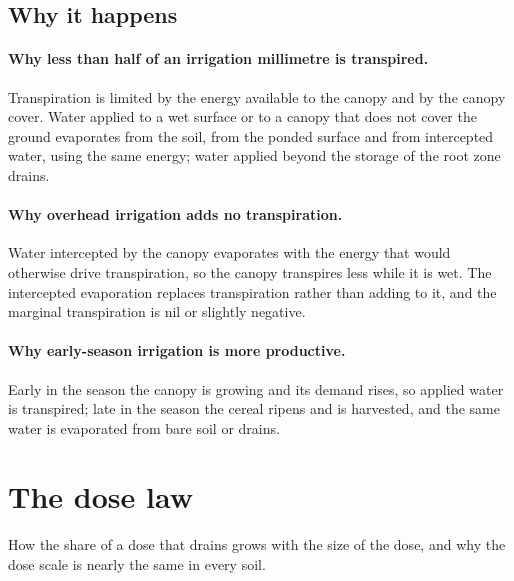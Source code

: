 \subsection{Why it happens}
\paragraph{Why less than half of an irrigation millimetre is transpired.} Transpiration is limited by the energy available to the canopy and by the canopy cover. Water applied to a wet surface or to a canopy that does not cover the ground evaporates from the soil, from the ponded surface and from intercepted water, using the same energy; water applied beyond the storage of the root zone drains.

\paragraph{Why overhead irrigation adds no transpiration.} Water intercepted by the canopy evaporates with the energy that would otherwise drive transpiration, so the canopy transpires less while it is wet. The intercepted evaporation replaces transpiration rather than adding to it, and the marginal transpiration is nil or slightly negative.

\paragraph{Why early-season irrigation is more productive.} Early in the season the canopy is growing and its demand rises, so applied water is transpired; late in the season the cereal ripens and is harvested, and the same water is evaporated from bare soil or drains.


\section{The dose law}
How the share of a dose that drains grows with the size of the dose, and why the dose scale is nearly the same in every soil.

